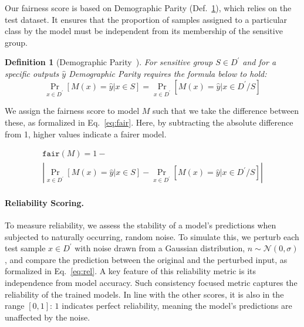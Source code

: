 \documentclass{uai2026}
\newtheorem{definition}{Definition}
\begin{document}
Our fairness score is based on Demographic Parity (Def.~\ref{def:DP}), which relies on the test dataset. It ensures that the proportion of samples assigned to a particular class by the model must be independent from its membership of the sensitive group.

\begin{definition}[Demographic Parity~\cite{calders2009building}]
    \label{def:DP}
    For sensitive group $S\in D^\prime$ and for a specific outputs $\hat{y}$ Demographic Parity requires the formula below to hold:
    \begin{equation*}
         \Pr_{x\in D^\prime}[M(x)=\hat{y} | x\in S] =
         \Pr_{x\in D^\prime}[M(x)=\hat{y} | x\in D^\prime/S]
    \end{equation*}
\end{definition}

We assign the fairness score to model $M$ such that we take the difference between these, as formalized in Eq.~\eqref{eq:fair}. Here, by subtracting the absolute difference from 1, higher values indicate a fairer model.

{\small\begin{equation}
    \begin{aligned}
    \label{eq:fair}
    \mathtt{fair}(M) = 1-\\
    \left|\Pr_{x\in D^\prime}[M(x)=\hat{y} | x\in S] -\Pr_{x\in D^\prime}[M(x)=\hat{y} | x\in D^\prime/S]\right|
    \end{aligned}
\end{equation}}

\paragraph{Reliability Scoring. }

To measure reliability, we assess the stability of a model's predictions when subjected to naturally occurring, random noise. To simulate this, we perturb each test sample $x\in D^\prime$ with noise drawn from a Gaussian distribution, $n\sim \mathcal{N}(0,\sigma)$, and compare the prediction between the original and the perturbed input, as formalized in Eq.~\eqref{eq:rel}. A key feature of this reliability metric is its independence from model accuracy. Such consistency focused metric captures the reliability of the trained models. In line with the other scores, it is also in the range $[0, 1]$: $1$ indicates perfect reliability, meaning the model's predictions are unaffected by the noise.
\end{document}
